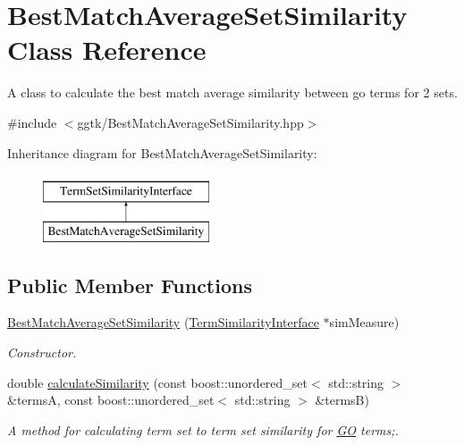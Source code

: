 \hypertarget{classBestMatchAverageSetSimilarity}{}\section{Best\+Match\+Average\+Set\+Similarity Class Reference}
\label{classBestMatchAverageSetSimilarity}


A class to calculate the best match average similarity between go terms for 2 sets.  




{\ttfamily \#include $<$ggtk/\+Best\+Match\+Average\+Set\+Similarity.\+hpp$>$}

Inheritance diagram for Best\+Match\+Average\+Set\+Similarity\+:\begin{figure}[H]
\begin{center}
\leavevmode
\includegraphics[height=2.000000cm]{classBestMatchAverageSetSimilarity}
\end{center}
\end{figure}
\subsection*{Public Member Functions}
\begin{DoxyCompactItemize}
\item 
\hyperlink{classBestMatchAverageSetSimilarity_afbc85286f64e945d9c3e0bf193171721}{Best\+Match\+Average\+Set\+Similarity} (\hyperlink{classTermSimilarityInterface}{Term\+Similarity\+Interface} $\ast$sim\+Measure)
\begin{DoxyCompactList}\small\item\em Constructor. \end{DoxyCompactList}\item 
double \hyperlink{classBestMatchAverageSetSimilarity_adf1b3109b46f04087f919bdb33e131f0}{calculate\+Similarity} (const boost\+::unordered\+\_\+set$<$ std\+::string $>$ \&termsA, const boost\+::unordered\+\_\+set$<$ std\+::string $>$ \&termsB)
\begin{DoxyCompactList}\small\item\em A method for calculating term set to term set similarity for \hyperlink{namespaceGO}{GO} terms;. \end{DoxyCompactList}\end{DoxyCompactItemize}


